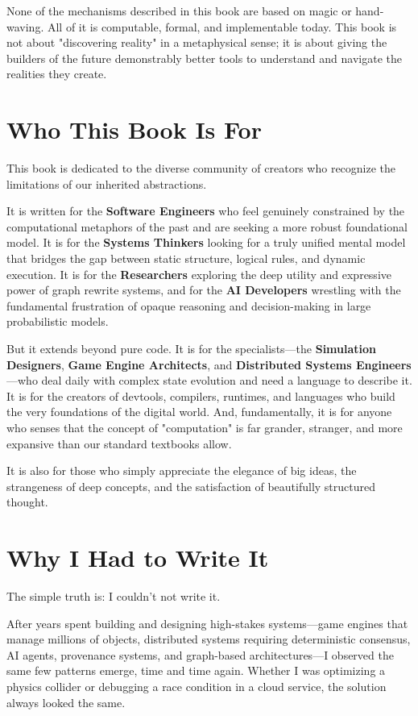 None of the mechanisms described in this book are based on magic or hand-waving. All of it is computable, formal, and implementable today. This book is not about "discovering reality" in a metaphysical sense; it is about giving the builders of the future demonstrably better tools to understand and navigate the realities they create.

\section{Who This Book Is For}
\label{sec:who-for}

This book is dedicated to the diverse community of creators who recognize the limitations of our inherited abstractions. 

It is written for the \textbf{Software Engineers} who feel genuinely constrained by the computational metaphors of the past and are seeking a more robust foundational model. It is for the \textbf{Systems Thinkers} looking for a truly unified mental model that bridges the gap between static structure, logical rules, and dynamic execution. It is for the \textbf{Researchers} exploring the deep utility and expressive power of graph rewrite systems, and for the \textbf{AI Developers} wrestling with the fundamental frustration of opaque reasoning and decision-making in large probabilistic models.

But it extends beyond pure code. It is for the specialists—the \textbf{Simulation Designers}, \textbf{Game Engine Architects}, and \textbf{Distributed Systems Engineers}—who deal daily with complex state evolution and need a language to describe it. It is for the creators of devtools, compilers, runtimes, and languages who build the very foundations of the digital world. And, fundamentally, it is for anyone who senses that the concept of "computation" is far grander, stranger, and more expansive than our standard textbooks allow.

It is also for those who simply appreciate the elegance of big ideas, the strangeness of deep concepts, and the satisfaction of beautifully structured thought.

\section{Why I Had to Write It}
\label{sec:why-had-to-write}

The simple truth is: I couldn't not write it.

After years spent building and designing high-stakes systems—game engines that manage millions of objects, distributed systems requiring deterministic consensus, AI agents, provenance systems, and graph-based architectures—I observed the same few patterns emerge, time and time again. Whether I was optimizing a physics collider or debugging a race condition in a cloud service, the solution always looked the same.

